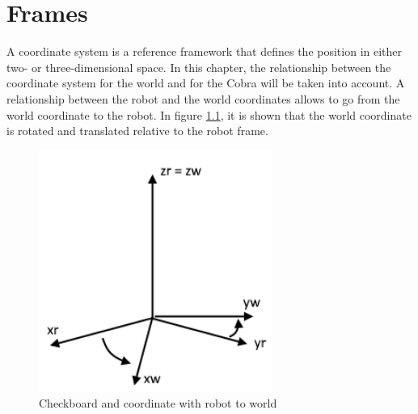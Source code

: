 \chapter{Frames}\label{ch:frames}
A coordinate system is a reference framework that defines the position in either two- or three-dimensional space. In this chapter, the relationship between the coordinate system for the world and for the Cobra will be taken into account. A relationship between the robot and the world coordinates allows to go from the world coordinate to the robot. In figure \ref{fig:check_coordrobottoworld}, it is shown that the world coordinate is rotated and translated relative to the robot frame. 
\begin{figure}[hb]
  \centering
  \includegraphics[width=3in]{figures/coordrobottoworld.png}
  \caption[Checkerboard and coordinate with robot to world] {Checkboard and coordinate with robot to world}
  \label{fig:check_coordrobottoworld}
\end{figure}

